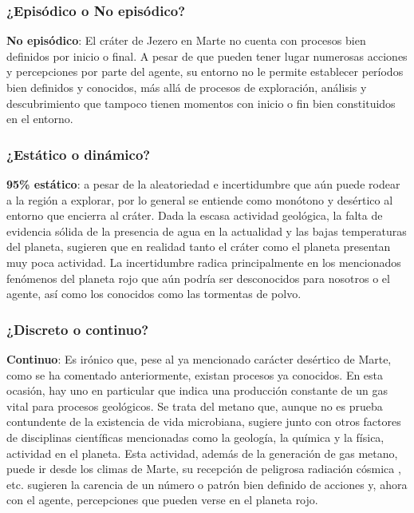 \documentclass[12pt, letterpaper]{article}
\begin{document}
        \subsubsection{¿Episódico o No episódico?}

        \textbf{No episódico}: El cráter de Jezero en Marte no cuenta con procesos bien definidos por inicio o final. A pesar de que pueden tener lugar numerosas acciones y percepciones por parte del agente, su entorno no le permite establecer períodos bien definidos y conocidos, más allá de procesos de exploración, análisis y descubrimiento que tampoco tienen momentos con inicio o fin bien constituidos en el entorno.
        
        \subsubsection{¿Estático o dinámico?}

        \textbf{95\% estático}: a pesar de la aleatoriedad e incertidumbre que aún puede rodear a la región a explorar, por lo general se entiende como monótono y desértico al entorno que encierra al cráter. Dada la escasa actividad geológica, la falta de evidencia sólida de la presencia de agua en la actualidad y las bajas temperaturas del planeta, sugieren que en realidad tanto el cráter como el planeta presentan muy poca actividad. La incertidumbre radica principalmente en los mencionados fenómenos del planeta rojo que aún podría ser desconocidos para nosotros o el agente, así como los conocidos como las tormentas de polvo.
    
        \subsubsection{¿Discreto o continuo?}

        \textbf{Continuo}: Es irónico que, pese al ya mencionado carácter desértico de Marte, como se ha comentado anteriormente, existan procesos ya conocidos. En esta ocasión, hay uno en particular que indica una producción constante de un gas vital para procesos geológicos. Se trata del metano que, aunque no es prueba contundente de la existencia de vida microbiana, sugiere junto con otros factores de disciplinas científicas mencionadas como la geología, la química y la física, actividad en el planeta. Esta actividad, además de la generación de gas metano, puede ir desde los climas de Marte, su recepción de peligrosa radiación cósmica \cite{campillo2021arquitecturas}, etc. sugieren la carencia de un número o patrón bien definido de acciones y, ahora con el agente, percepciones que pueden verse en el planeta rojo.
    
\end{document}
